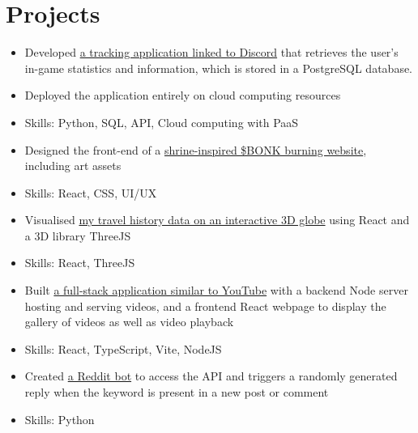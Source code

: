 \documentclass{cv}
\begin{document}
\section{Projects}
\begin{subsections}
    \begin{itemize}
        \item Developed \href{https://thedylone.github.io/laffey-bot/}{a tracking application linked to Discord} that retrieves the user's in-game statistics and information, which is stored in a PostgreSQL database.
        \item Deployed the application entirely on cloud computing resources
        \item Skills: Python, SQL, API, Cloud computing with PaaS
    \end{itemize}

    \begin{itemize}
        \item Designed the front-end of a \href{https://bonk-shrine.vercel.app/}{shrine-inspired \$BONK burning website}, including art assets
        \item Skills: React, CSS, UI/UX
    \end{itemize}

    \begin{itemize}
        \item Visualised \href{https://thedylone.github.io/travel-history/}{my travel history data on an interactive 3D globe} using React and a 3D library ThreeJS
        \item Skills: React, ThreeJS
    \end{itemize}

    \begin{itemize}
        \item Built \href{https://github.com/thedylone/node-video-player}{a full-stack application similar to YouTube} with a backend Node server hosting and serving videos, and a frontend React webpage to display the gallery of videos as well as video playback
        \item Skills: React, TypeScript, Vite, NodeJS
    \end{itemize}

    \begin{itemize}
        \item Created \href{https://github.com/thedylone/suipiss}{a Reddit bot} to access the API and triggers a randomly generated reply when the keyword is present in a new post or comment
        \item Skills: Python
    \end{itemize}
\end{subsections}
\end{document}
